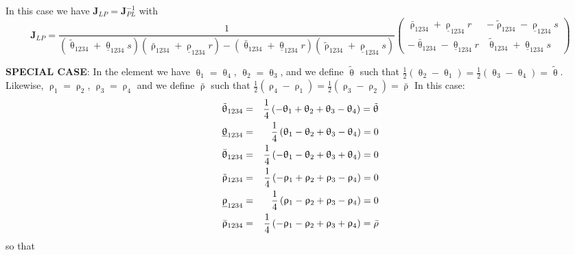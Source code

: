 In this case we have ${\bm J}_{LP}={\bm J}_{PL}^{-1}$ with
\begin{equation}
{\bm J}_{LP}= \frac{1}{ 
(\tilde{\uptheta}_{1234} + \underline{\uptheta}_{1234}s)
( \bar{\uprho}_{1234} + \underline{\uprho}_{1234} r)
- 
(\bar{\uptheta}_{1234} + \underline{\uptheta}_{1234}r)
(\tilde{\uprho}_{1234} + \underline{\uprho}_{1234} s)
} 
\left(
\begin{array}{cc}
\bar{\uprho}_{1234}+ \underline{\uprho}_{1234} r & -\tilde{\uprho}_{1234} - \underline{\uprho}_{1234} s \\
-\bar{\uptheta}_{1234} -\underline{\uptheta}_{1234}r& \tilde{\uptheta}_{1234}+ \underline{\uptheta}_{1234}s
\end{array}
\right)
\end{equation}


{\bf SPECIAL CASE}: In the element we have
$\uptheta_1=\uptheta_4$, $\uptheta_2=\uptheta_3$,
and we define $\tilde{\uptheta}$ such that 
$\frac12(\uptheta_2-\uptheta_1)=\frac12(\uptheta_3-\uptheta_4)=\tilde{\uptheta}$.
Likewise,
$\uprho_1=\uprho_2$, $\uprho_3=\uprho_4$ and
we define $\bar{\uprho}$ such that $\frac12(\uprho_4-\uprho_1)=\frac12(\uprho_3-\uprho_2)=\bar{\uprho}$
In this case:
\begin{eqnarray}
\tilde{\uptheta}_{1234}     &=&\frac14\left( -\uptheta_1 +\uptheta_2 + \uptheta_3 -\uptheta_4 \right) =\tilde{\uptheta}\nonumber\\
\underline{\uptheta}_{1234} &=&\frac14\left(  \uptheta_1 -\uptheta_2 + \uptheta_3 -\uptheta_4 \right)=0\nonumber\\
\bar{\uptheta}_{1234}       &=&\frac14\left( -\uptheta_1 -\uptheta_2 + \uptheta_3 +\uptheta_4 \right)=0 \nonumber\\
\tilde{\uprho}_{1234}       &=&\frac14\left( -\uprho_1 +\uprho_2 + \uprho_3 -\uprho_4\right) =0\nonumber\\
\underline{\uprho}_{1234}   &=&\frac14\left(  \uprho_1 -\uprho_2 + \uprho_3 -\uprho_4\right) =0\nonumber\\
\bar{\uprho}_{1234}         &=&\frac14\left( -\uprho_1 -\uprho_2 + \uprho_3 +\uprho_4\right) = \bar\rho 
\end{eqnarray}
so that 

